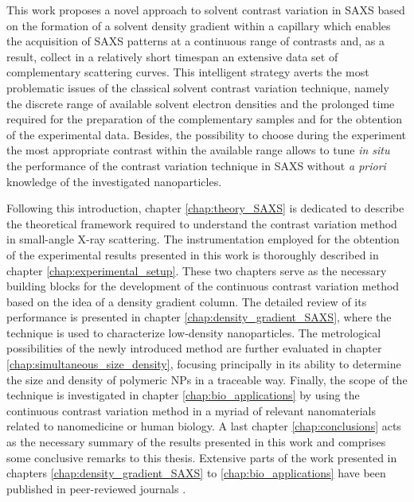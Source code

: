 This work proposes a novel approach to solvent contrast variation in SAXS based on the formation of a solvent density gradient within a capillary which enables the acquisition of SAXS patterns at a continuous range of contrasts and, as a result, collect in a relatively short timespan an extensive data set of complementary scattering curves. This intelligent strategy averts the most problematic issues of the classical solvent contrast variation technique, namely the discrete range of available solvent electron densities and the prolonged time required for the preparation of the complementary samples and for the obtention of the experimental data. Besides, the possibility to choose during the experiment the most appropriate contrast within the available range allows to tune \emph{in situ} the performance of the contrast variation technique in SAXS without \emph{a priori} knowledge of the investigated nanoparticles.

Following this introduction, chapter \ref{chap:theory_SAXS} is dedicated to describe the theoretical framework required to understand the contrast variation method in small-angle X-ray scattering. The instrumentation employed for the obtention of the experimental results presented in this work is thoroughly described in chapter \ref{chap:experimental_setup}. These two chapters serve as the necessary building blocks for the development of the continuous contrast variation method based on the idea of a density gradient column. The detailed review of its performance is presented in chapter \ref{chap:density_gradient_SAXS}, where the technique is used to characterize low-density nanoparticles. The metrological possibilities of the newly introduced method are further evaluated in chapter \ref{chap:simultaneous_size_density}, focusing principally in its ability to determine the size and density of polymeric NPs in a traceable way. Finally, the scope of the technique is investigated in chapter \ref{chap:bio_applications} by using the continuous contrast variation method in a myriad of relevant nanomaterials related to nanomedicine or human biology. A last chapter \ref{chap:conclusions} acts as the necessary summary of the results presented in this work and comprises some conclusive remarks to this thesis. Extensive parts of the work presented in chapters \ref{chap:density_gradient_SAXS} to \ref{chap:bio_applications} have been published in peer-reviewed journals \citep{minelli_characterization_2014,garcia-diez_nanoparticle_2015,garcia-diez_size_2016,garcia-diez_simultaneous_2016-1}.




